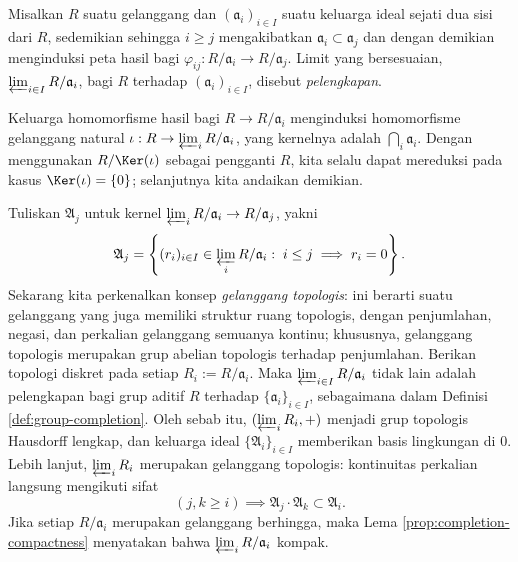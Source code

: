 \begin{definition}\label{def:ring-completion}
	Misalkan $R$ suatu gelanggang dan $(\mathfrak{a}_i)_{i \in I}$ suatu keluarga ideal sejati dua sisi dari $R$, sedemikian sehingga $i \geq j$ mengakibatkan $\mathfrak{a}_i \subset \mathfrak{a}_j$ dan dengan demikian menginduksi peta hasil bagi $\varphi_{ij}: R/\mathfrak{a}_i \to R/\mathfrak{a}_j$. Limit yang bersesuaian, $\varprojlim_{i \in I} R/\mathfrak{a}_i$, bagi $R$ terhadap $(\mathfrak{a}_i)_{i \in I}$, disebut \emph{pelengkapan}.
\end{definition}
Keluarga homomorfisme hasil bagi $R \to R/\mathfrak{a}_i$ menginduksi homomorfisme gelanggang natural $\iota: R \to \varprojlim_i R/\mathfrak{a}_i$, yang kernelnya adalah $\bigcap_i \mathfrak{a}_i$. Dengan menggunakan $R/\Ker(\iota)$ sebagai pengganti $R$, kita selalu dapat mereduksi pada kasus $\Ker(\iota)=\{0\}$; selanjutnya kita andaikan demikian.

Tuliskan $\mathfrak{A}_j$ untuk kernel $\varprojlim_i R/\mathfrak{a}_i \to R/\mathfrak{a}_j$, yakni
\[ \mathfrak{A}_j = \left\{ (r_i)_{i \in I} \in \varprojlim_i R/\mathfrak{a}_i : \; i \leq j \implies r_i=0 \right\}. \]
Sekarang kita perkenalkan konsep \emph{gelanggang topologis}:  ini berarti suatu gelanggang yang juga memiliki struktur ruang topologis, dengan penjumlahan, negasi, dan perkalian gelanggang semuanya kontinu; khususnya, gelanggang topologis merupakan grup abelian topologis terhadap penjumlahan. Berikan topologi diskret pada setiap $R_i := R/\mathfrak{a}_i$. Maka $\varprojlim_{i \in I} R/\mathfrak{a}_i$ tidak lain adalah pelengkapan bagi grup aditif $R$ terhadap $\{\mathfrak{a}_i\}_{i \in I}$, sebagaimana dalam Definisi \ref{def:group-completion}. Oleh sebab itu, $(\varprojlim_i R_i, +)$ menjadi grup topologis Hausdorff lengkap, dan keluarga ideal $\{\mathfrak{A}_i\}_{i \in I}$ memberikan basis lingkungan di $0$. Lebih lanjut, $\varprojlim_i R_i$ merupakan gelanggang topologis: kontinuitas perkalian langsung mengikuti sifat
\[ (j,k \geq i) \implies \mathfrak{A}_j \cdot \mathfrak{A}_k \subset \mathfrak{A}_i. \]
Jika setiap $R/\mathfrak{a}_i$ merupakan gelanggang berhingga, maka Lema \ref{prop:completion-compactness} menyatakan bahwa $\varprojlim_i R/\mathfrak{a}_i$ kompak.

